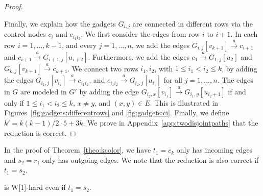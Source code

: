 \documentclass[a4paper,english]{lipics-v2016}
\theoremstyle{plain}
\begin{document}
\begin{proof}
\begin{figure*}[ht]
\caption{The $a$-edges from row $i$ to row $i+1$. (We
  assume $n=3$ in the picture).}
\label{fig:gadgets:ci}
\end{figure*}


   Finally, we explain how the gadgets $G_{i,j}$ are connected in
   different rows via the control nodes $c_i$ and $c_{i_1i_2}$.  We
   first consider the edges from row $i$ to $i+1$.
      In each row $i=1,\ldots,k-1$, and every $j = 1,\ldots,n$, we add
   the edges $G_{i,j}[v_{k+1}] \stackrel{a}{\to} c_{i+1}$ and $c_{i+1}
   \stackrel{a}{\to} G_{i+1,j}[u_{i+2}]$.  Furthermore, we add the
   edges $c_{1} \stackrel{a}{\to} G_{1,j}[u_{2}]$ and
   $G_{k,j}[v_{k+1}] \stackrel{a}{\to} c_{k+1}$.  We connect two rows
   $i_1,i_2$, with $1 \leq i_1 < i_2 \leq k$, by adding the edges
   $G_{i_1,j}[v_{i_2}] \stackrel{a}{\to} c_{i_1i_2}$, and $c_{i_1i_2}
   \stackrel{a}{\to} G_{i_2,j}[u_{i_1}]$ for all $j=1,\ldots,n$.  The
   edges in $G$ are modeled in $G'$ by adding the edge
   $G_{i_2,x}[v_{i_1}] \stackrel{a}{\to} G_{i_1,y}[u_{i_2+1}]$ if and
   only if $1\leq i_1 < i_2 \leq k$, $x \neq y$, and $(x,y) \in
   E$. This is illustrated in Figures~\ref{fig:gadgets:differentrows} and \ref{fig:gadgets:ci}.
   Finally, we define $k' = k(k-1)/2\cdot 5+3k$. We prove in
   Appendix~\ref{app:twodisjointpaths} that the reduction is correct.
\end{proof}

In the proof of Theorem~\ref{theo:kcolor}, we have $t_1 = c_k$ only has incoming edges and
$s_2 = r_1$ only has outgoing edges. We note that
the reduction is also correct if $t_1 = s_2$. 
\begin{corollary} \label{akb*-is-hard}
\kcolordisjointpaths is W[1]-hard even if $t_1 = s_2$.
  \end{corollary}
\end{document}
